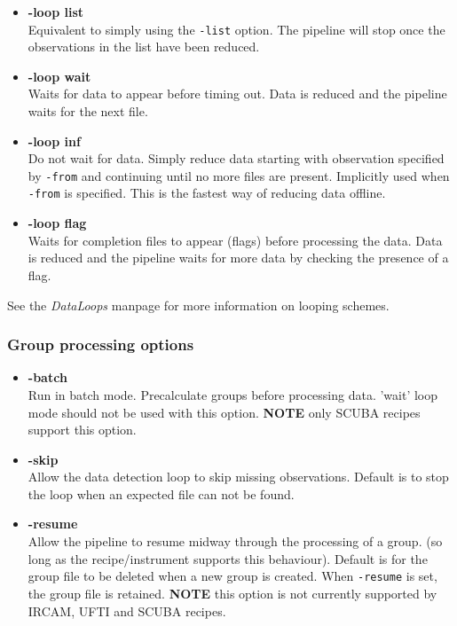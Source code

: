 \documentclass[twoside,11pt]{article}
\renewcommand{\_}{\texttt{\symbol{95}}}
\begin{document}
\begin{itemize}

\item{\bf -loop list}%
%
\hfil\\
Equivalent to simply using the {\tt -list} option. The pipeline will stop
once the observations in the list have been reduced.

\item{\bf -loop wait}%
%
\hfil\\
Waits for data to appear before timing out. Data is reduced and the pipeline
waits for the next file.

\item{\bf -loop inf}%
%
\hfil\\
Do not wait for data. Simply reduce data starting with observation
specified by {\tt -from} and continuing until no more files are present.
Implicitly used when {\tt -from} is specified. This is the fastest way
of reducing data offline.

\item{\bf -loop flag}%
%
\hfil\\
Waits for completion files to appear (flags) before processing the data.
Data is reduced and the pipeline waits for more data by checking the
presence of a flag.

\end{itemize}

See the {\em DataLoops\/} manpage for more
information on looping schemes.

\subsubsection*{Group processing options}%

\begin{itemize}

\item{\bf -batch}%
%
\hfil\\
Run in batch mode. Precalculate groups before processing
data. 'wait' loop mode should not be used with this option.
{\bf NOTE} only SCUBA recipes support this option.

\item{\bf -skip}%
%
\hfil\\
Allow the data detection loop to skip missing observations.
Default is to stop the loop when an expected file can not be found.

\item{\bf -resume}%
%
\hfil\\
Allow the pipeline to resume midway through the processing
of a group. (so long as the recipe/instrument supports
this behaviour). Default is for the group file to be deleted
when a new group is created. When {\tt -resume} is set, the group
file is retained. {\bf NOTE} this option is not currently supported by
IRCAM, UFTI and SCUBA recipes.

\end{itemize}
\end{document}
